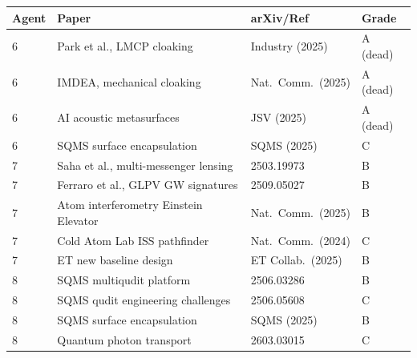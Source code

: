 \documentclass[11pt]{article}
\begin{document}
\begin{longtable}{p{}p{}p{}p{}}
\toprule
\textbf{Agent} & \textbf{Paper} & \textbf{arXiv/Ref} & \textbf{Grade} \\
\midrule
\endhead
6 & Park et al., LMCP cloaking & Industry (2025) & A (dead) \\
6 & IMDEA, mechanical cloaking & Nat.\ Comm.\ (2025) & A (dead) \\
6 & AI acoustic metasurfaces & JSV (2025) & A (dead) \\
6 & SQMS surface encapsulation & SQMS (2025) & C \\
\midrule
7 & Saha et al., multi-messenger lensing & 2503.19973 & B \\
7 & Ferraro et al., GLPV GW signatures & 2509.05027 & B \\
7 & Atom interferometry Einstein Elevator & Nat.\ Comm.\ (2025) & B \\
7 & Cold Atom Lab ISS pathfinder & Nat.\ Comm.\ (2024) & C \\
7 & ET new baseline design & ET Collab.\ (2025) & B \\
\midrule
8 & SQMS multiqudit platform & 2506.03286 & B \\
8 & SQMS qudit engineering challenges & 2506.05608 & C \\
8 & SQMS surface encapsulation & SQMS (2025) & B \\
8 & Quantum photon transport & 2603.03015 & C \\
\bottomrule
\end{longtable}
\end{document}

